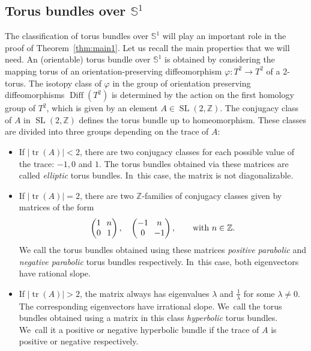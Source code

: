 \documentclass[11pt]{article}
\DeclareMathOperator{\SL}{SL}
\theoremstyle{definition}
\begin{document}
\subsection{Torus bundles over $\mathbb{S}^1$}
The classification of torus bundles over $\mathbb{S}^1$ will play an important role in the proof of Theorem~\ref{thm:main1}. Let us recall the main properties that we will need. An (orientable) torus bundle over $\mathbb{S}^1$ is obtained by considering the mapping torus of an orientation-preserving diffeomorphism $\varphi:T^2\to T^2$ of a 2-torus. The isotopy class of $\varphi$ in the group of orientation preserving diffeomorphisms $\operatorname{Diff}(T^2)$ is determined by the action on the first homology group of $T^2$, which is given by an element $A\in \SL(2,\mathbb{Z})$.
The conjugacy class of $A$ in $\SL(2,\mathbb{Z})$ defines the torus bundle up to homeomorphism. These classes are divided into three groups depending on the trace of $A$:
\begin{itemize}
\item
If $|{\operatorname{tr}(A)}|<2$, there are two conjugacy classes for each possible value of the trace: $-1, 0$ and $1$. The torus bundles obtained via these matrices are called \textit{elliptic} torus bundles. In~this case, the matrix is not diagonalizable.
\item
If $|{\operatorname{tr}(A)}|=2$, there are two $\mathbb{Z}$-families of conjugacy classes given by matrices of the form
\[
\arraycolsep3.5pt
\begin{pmatrix}
1 & n \\
0 & 1
\end{pmatrix},\quad \begin{pmatrix}
-1 & n \\
0 & -1
\end{pmatrix}, \qquad\text{with } n\in \mathbb{Z}.
\]
We call the torus bundles obtained using these matrices \textit{positive parabolic} and \textit{negative parabolic} torus bundles respectively. In~this case, both eigenvectors have rational slope.
\item
If $|{\operatorname{tr}(A)}|>2$, the matrix always has eigenvalues $\lambda$ and $\frac{1}{\lambda}$ for some $\lambda\neq 0$. The corresponding eigenvectors have irrational slope. We~call the torus bundles obtained using a matrix in this class \textit{hyperbolic} torus bundles. We~call it a positive or negative hyperbolic bundle if the trace of $A$ is positive or negative respectively.
\end{itemize}
\end{document}
